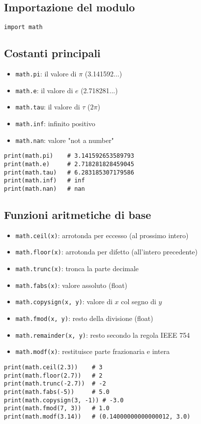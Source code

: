 \documentclass[a4paper,12pt]{article}
\begin{document}
\subsection*{Importazione del modulo}
\begin{lstlisting}
import math
\end{lstlisting}

\subsection*{Costanti principali}
\begin{itemize}
    \item \texttt{math.pi}: il valore di $\pi$ (3.141592...)
    \item \texttt{math.e}: il valore di $e$ (2.718281...)
    \item \texttt{math.tau}: il valore di $\tau$ ($2\pi$)
    \item \texttt{math.inf}: infinito positivo
    \item \texttt{math.nan}: valore "not a number"
\end{itemize}
\begin{lstlisting}
print(math.pi)    # 3.141592653589793
print(math.e)     # 2.718281828459045
print(math.tau)   # 6.283185307179586
print(math.inf)   # inf
print(math.nan)   # nan
\end{lstlisting}

\subsection*{Funzioni aritmetiche di base}
\begin{itemize}
    \item \texttt{math.ceil(x)}: arrotonda per eccesso (al prossimo intero)
    \item \texttt{math.floor(x)}: arrotonda per difetto (all'intero precedente)
    \item \texttt{math.trunc(x)}: tronca la parte decimale
    \item \texttt{math.fabs(x)}: valore assoluto (float)
    \item \texttt{math.copysign(x, y)}: valore di $x$ col segno di $y$
    \item \texttt{math.fmod(x, y)}: resto della divisione (float)
    \item \texttt{math.remainder(x, y)}: resto secondo la regola IEEE 754
    \item \texttt{math.modf(x)}: restituisce parte frazionaria e intera
\end{itemize}
\begin{lstlisting}
print(math.ceil(2.3))    # 3
print(math.floor(2.7))   # 2
print(math.trunc(-2.7))  # -2
print(math.fabs(-5))     # 5.0
print(math.copysign(3, -1)) # -3.0
print(math.fmod(7, 3))   # 1.0
print(math.modf(3.14))   # (0.14000000000000012, 3.0)
\end{lstlisting}
\end{document}
